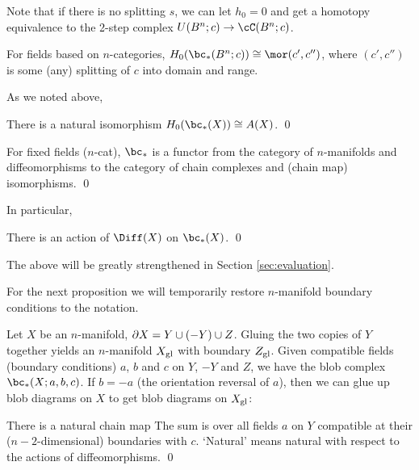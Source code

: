 \documentclass[11pt,leqno]{amsart}
\begin{document}
Note that if there is no splitting $s$, we can let $h_0 = 0$ and get a homotopy
equivalence to the 2-step complex $U(B^n; c) \to \cC(B^n; c)$.

For fields based on $n$-categories, $H_0(\bc_*(B^n; c)) \cong \mor(c', c'')$,
where $(c', c'')$ is some (any) splitting of $c$ into domain and range.

\medskip


As we noted above,
\begin{prop}
There is a natural isomorphism $H_0(\bc_*(X)) \cong A(X)$.
\qed
\end{prop}


\begin{prop}
For fixed fields ($n$-cat), $\bc_*$ is a functor from the category
of $n$-manifolds and diffeomorphisms to the category of chain complexes and
(chain map) isomorphisms.
\qed
\end{prop}

In particular,
\begin{prop}  \label{diff0prop}
There is an action of $\Diff(X)$ on $\bc_*(X)$.
\qed
\end{prop}

The above will be greatly strengthened in Section \ref{sec:evaluation}.

\medskip

For the next proposition we will temporarily restore $n$-manifold boundary
conditions to the notation.

Let $X$ be an $n$-manifold, $\partial X = Y \cup (-Y) \cup Z$.
Gluing the two copies of $Y$ together yields an $n$-manifold $X_\mathrm{gl}$
with boundary $Z_\mathrm{gl}$.
Given compatible fields (boundary conditions) $a$, $b$ and $c$ on $Y$, $-Y$ and $Z$,
we have the blob complex $\bc_*(X; a, b, c)$.
If $b = -a$ (the orientation reversal of $a$), then we can glue up blob diagrams on
$X$ to get blob diagrams on $X_\mathrm{gl}$:

\begin{prop}
There is a natural chain map
The sum is over all fields $a$ on $Y$ compatible at their
($n{-}2$-dimensional) boundaries with $c$.
`Natural' means natural with respect to the actions of diffeomorphisms.
\qed
\end{prop}
\end{document}
